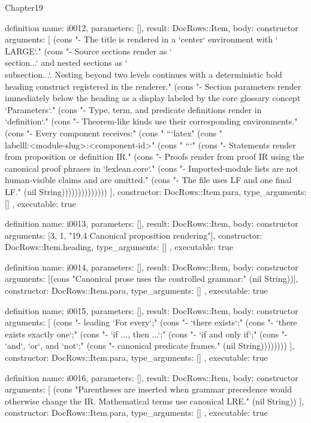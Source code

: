 \begin{lexlean}{Chapter19}
\begin{semanticmodule}
definition{
  name: i0012,
  parameters: [],
  result: DocRows::Item,
  body: constructor{
    arguments: [
      (cons "- The title is rendered in a `center` environment with `\\LARGE`." (cons "- Source sections render as `\\section{...}` and nested sections as `\\subsection{...}`. Nesting beyond two levels continues with a deterministic bold heading construct registered in the renderer." (cons "- Section parameters render immediately below the heading as a display labeled by the core glossary concept `Parameters`." (cons "- Type, term, and predicate definitions render in `definition`." (cons "- Theorem-like kinds use their corresponding environments." (cons "- Every component receives:" (cons "  ```latex" (cons "  \\label{ll:<module-slug>:<component-id>}" (cons "  ```" (cons "- Statements render from proposition or definition IR." (cons "- Proofs render from proof IR using the canonical proof phrases in `lexlean.core`." (cons "- Imported-module lists are not human-visible claims and are omitted." (cons "- The file uses LF and one final LF." (nil String))))))))))))))
    ],
    constructor: DocRows::Item.para,
    type_arguments: []
  },
  executable: true
}

definition{
  name: i0013,
  parameters: [],
  result: DocRows::Item,
  body: constructor{
    arguments: [3, 1, "19.4 Canonical proposition rendering"],
    constructor: DocRows::Item.heading,
    type_arguments: []
  },
  executable: true
}

definition{
  name: i0014,
  parameters: [],
  result: DocRows::Item,
  body: constructor{
    arguments: [(cons "Canonical prose uses the controlled grammar:" (nil String))],
    constructor: DocRows::Item.para,
    type_arguments: []
  },
  executable: true
}

definition{
  name: i0015,
  parameters: [],
  result: DocRows::Item,
  body: constructor{
    arguments: [
      (cons "- leading `For every`;" (cons "- `there exists`;" (cons "- `there exists exactly one`;" (cons "- `if ..., then ...`;" (cons "- `if and only if`;" (cons "- `and`, `or`, and `not`;" (cons "- canonical predicate frames." (nil String))))))))
    ],
    constructor: DocRows::Item.para,
    type_arguments: []
  },
  executable: true
}

definition{
  name: i0016,
  parameters: [],
  result: DocRows::Item,
  body: constructor{
    arguments: [
      (cons "Parentheses are inserted when grammar precedence would otherwise change the IR. Mathematical terms use canonical LRE." (nil String))
    ],
    constructor: DocRows::Item.para,
    type_arguments: []
  },
  executable: true
}


\end{semanticmodule}
\end{lexlean}
